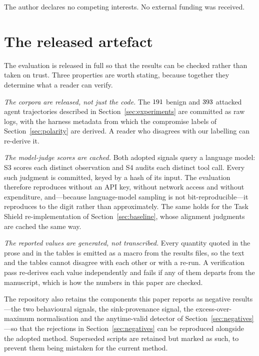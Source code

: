 \documentclass[preprint,12pt,authoryear]{elsarticle}
\theoremstyle{definition}
\begin{document}
The author declares no competing interests. No external funding was received.

\appendix

\section{The released artefact}\label{app:artefact}

The evaluation is released in full so that the results can be checked rather than
taken on trust. Three properties are worth stating, because together they
determine what a reader can verify.

\emph{The corpora are released, not just the code.} The $191$ benign and
$393$ attacked agent trajectories described in Section~\ref{sec:experiments}
are committed as raw logs, with the harness metadata from which the compromise
labels of Section~\ref{sec:polarity} are derived. A reader who disagrees with our
labelling can re-derive it.

\emph{The model-judge scores are cached.} Both adopted signals query a language
model: S3 scores each distinct observation and S4 audits each distinct tool call.
Every such judgment is committed, keyed by a hash of its input. The evaluation
therefore reproduces without an API key, without network access and without
expenditure, and---because language-model sampling is not bit-reproducible---it
reproduces to the digit rather than approximately. The same holds for the Task
Shield re-implementation of Section~\ref{sec:baseline}, whose alignment judgments
are cached the same way.

\emph{The reported values are generated, not transcribed.} Every quantity quoted
in the prose and in the tables is emitted as a macro from the results files, so
the text and the tables cannot disagree with each other or with a re-run. A
verification pass re-derives each value independently and fails if any of them
departs from the manuscript, which is how the numbers in this paper are checked.

The repository also retains the components this paper reports as negative
results---the two behavioural signals, the sink-provenance signal, the
excess-over-maximum normalisation and the anytime-valid detector of
Section~\ref{sec:negatives}---so that the rejections in Section~\ref{sec:negatives}
can be reproduced alongside the adopted method. Superseded scripts are retained
but marked as such, to prevent them being mistaken for the current method.



\end{document}
